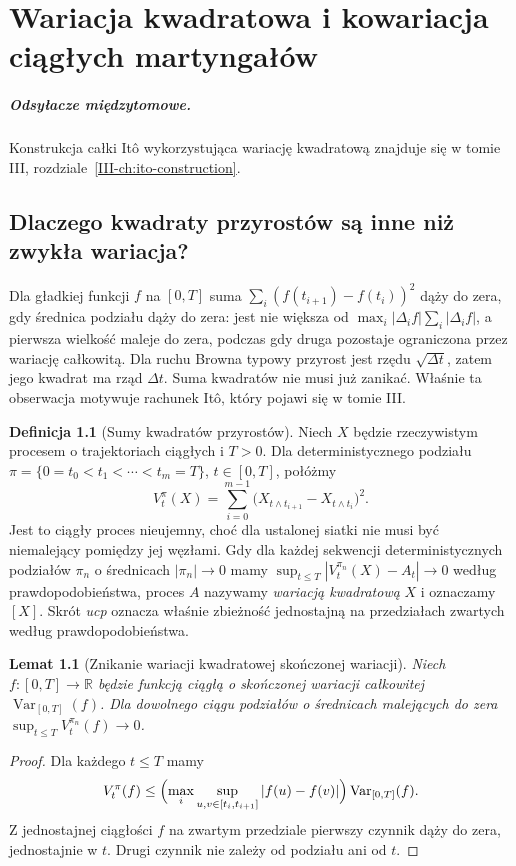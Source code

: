 \documentclass[11pt,a4paper,oneside]{report}
\numberwithin{equation}{chapter}
\theoremstyle{plain}
\newtheorem{lemat}[twierdzenie]{Lemat}
\theoremstyle{definition}
\newtheorem{definicja}{Definicja}[chapter]
\theoremstyle{remark}
\newcommand{\R}{\mathbb{R}}
\begin{document}
\chapter{Wariacja kwadratowa i kowariacja ciągłych martyngałów}
\label{ch:quadratic-cont}
\paragraph{Odsyłacze międzytomowe.} Konstrukcja całki Itô wykorzystująca wariację kwadratową znajduje się w tomie III, rozdziale~\ref{III-ch:ito-construction}.


\section{Dlaczego kwadraty przyrostów są inne niż zwykła wariacja?}
Dla gładkiej funkcji $f$ na $[0,T]$ suma
$\sum_i(f(t_{i+1})-f(t_i))^2$ dąży do zera, gdy
średnica podziału dąży do zera: jest nie większa od
$\max_i|\Delta_i f|\sum_i|\Delta_i f|$, a pierwsza
wielkość maleje do zera, podczas gdy druga pozostaje
ograniczona przez wariację całkowitą. Dla ruchu Browna
typowy przyrost jest rzędu $\sqrt{\Delta t}$, zatem
jego kwadrat ma rząd $\Delta t$. Suma kwadratów
nie musi już zanikać. Właśnie ta obserwacja motywuje
rachunek Itô, który pojawi się w tomie III.

\begin{definicja}[Sumy kwadratów przyrostów]
Niech $X$ będzie rzeczywistym procesem o trajektoriach
ciągłych i $T>0$. Dla deterministycznego podziału
$\pi=\{0=t_0<t_1<\cdots<t_m=T\}$, $t\in[0,T]$,
połóżmy
\[
V_t^\pi(X)=\sum_{i=0}^{m-1}
\bigl(X_{t\wedge t_{i+1}}-X_{t\wedge t_i}\bigr)^2.
\]
Jest to ciągły proces nieujemny, choć dla ustalonej
siatki nie musi być niemalejący pomiędzy jej węzłami.
Gdy dla każdej sekwencji deterministycznych podziałów
$\pi_n$ o średnicach $|\pi_n|\to0$ mamy
$\sup_{t\le T}|V_t^{\pi_n}(X)-A_t|\to0$
według prawdopodobieństwa, proces $A$ nazywamy
\emph{wariacją kwadratową} $X$ i oznaczamy $[X]$.
Skrót \emph{ucp} oznacza właśnie zbieżność jednostajną
na przedziałach zwartych według prawdopodobieństwa.
\end{definicja}

\begin{lemat}[Znikanie wariacji kwadratowej skończonej wariacji]
Niech $f:[0,T]\to\R$ będzie funkcją ciągłą o
skończonej wariacji całkowitej $\operatorname{Var}_{[0,T]}(f)$.
Dla dowolnego ciągu podziałów o średnicach malejących
do zera
$\sup_{t\le T}V_t^{\pi_n}(f)\to0$.
\end{lemat}
\begin{proof}
Dla każdego $t\le T$ mamy
\[
V_t^\pi(f)\le
\Bigl(\max_i\sup_{u,v\in[t_i,t_{i+1}]}|f(u)-f(v)|\Bigr)
\operatorname{Var}_{[0,T]}(f).
\]
Z jednostajnej ciągłości $f$ na zwartym przedziale
pierwszy czynnik dąży do zera, jednostajnie w $t$.
Drugi czynnik nie zależy od podziału ani od $t$.
\end{proof}
\end{document}
